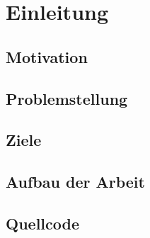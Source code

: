 \chapter{Einleitung}

\section{Motivation}

\section{Problemstellung}

\section{Ziele}

\section{Aufbau der Arbeit}

\section{Quellcode}
